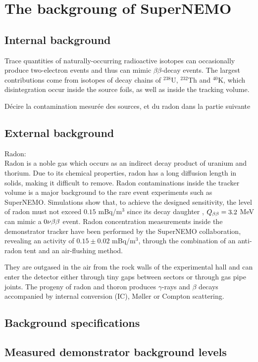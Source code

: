 \section{The backgroung of SuperNEMO}
\label{sec:SNbkg}
\subsection{Internal background}
\label{subsec:SNbkg_internal}

Trace quantities of naturally-occurring radioactive isotopes can occasionally produce two-electron events and thus can mimic $\beta\beta$-decay events.
The largest contributions come from isotopes of decay chains of $^{238}$U, $^{232}$Th and $^{40}$K, which disintegration occur inside the source foils, as well as inside the tracking volume.

Décire la contamination mesurée des sources, et du radon dans la partie suivante

\subsection{External background}
Radon:\\
Radon is a noble gas which occurs as an indirect decay product of uranium and thorium.
Due to its chemical properties, radon has a long diffusion length in solids, making it difficult to remove.
Radon contaminations inside the tracker volume is a major background to the rare event experiments such as SuperNEMO.
Simulations show that, to achieve the designed sensitivity, the level of radon must not exceed $0.15$ mBq/m$^{3}$ since its decay daughter \Bi, $Q_{\beta\beta}= 3.2$ MeV can mimic a $0\nu\beta\beta$ event.
Radon concentration measurements inside the demonstrator tracker have been performed by the SuperNEMO collaboration, revealing an activity of $0.15\pm0.02$ mBq/m$^{3}$, through the combination of an anti-radon tent and an air-flushing method.

They are outgased in the air from the rock walls of the experimental hall and can enter the detector either through tiny gaps between sectors or through gas pipe joints.
The progeny of radon and thoron produces $\gamma$-rays and $\beta$ decays accompanied by internal conversion (IC), Møller or Compton scattering.
\subsection{Background specifications}
\subsection{Measured demonstrator background levels}

